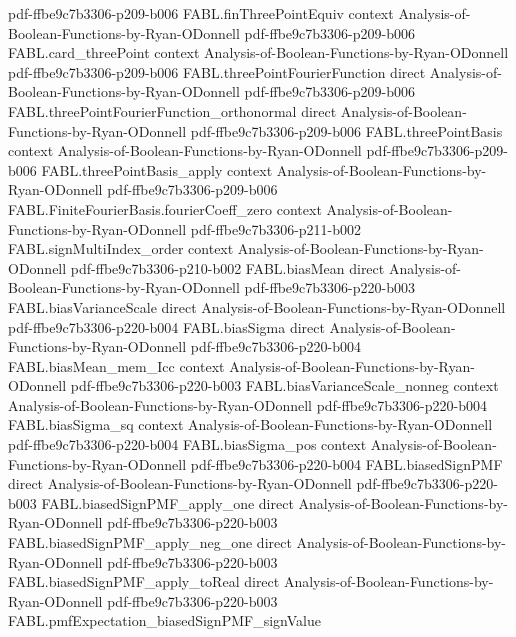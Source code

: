 \begin{theorem}
  {pdf-ffbe9c7b3306-p209-b006}
\proofstep
  {FABL.finThreePointEquiv}
  {context}
  {Analysis-of-Boolean-Functions-by-Ryan-ODonnell}
  {pdf-ffbe9c7b3306-p209-b006}
\proofstep
  {FABL.card_threePoint}
  {context}
  {Analysis-of-Boolean-Functions-by-Ryan-ODonnell}
  {pdf-ffbe9c7b3306-p209-b006}
\proofstep
  {FABL.threePointFourierFunction}
  {direct}
  {Analysis-of-Boolean-Functions-by-Ryan-ODonnell}
  {pdf-ffbe9c7b3306-p209-b006}
\proofstep
  {FABL.threePointFourierFunction_orthonormal}
  {direct}
  {Analysis-of-Boolean-Functions-by-Ryan-ODonnell}
  {pdf-ffbe9c7b3306-p209-b006}
\proofstep
  {FABL.threePointBasis}
  {context}
  {Analysis-of-Boolean-Functions-by-Ryan-ODonnell}
  {pdf-ffbe9c7b3306-p209-b006}
\proofstep
  {FABL.threePointBasis_apply}
  {context}
  {Analysis-of-Boolean-Functions-by-Ryan-ODonnell}
  {pdf-ffbe9c7b3306-p209-b006}
\proofstep
  {FABL.FiniteFourierBasis.fourierCoeff_zero}
  {context}
  {Analysis-of-Boolean-Functions-by-Ryan-ODonnell}
  {pdf-ffbe9c7b3306-p211-b002}
\proofstep
  {FABL.signMultiIndex_order}
  {context}
  {Analysis-of-Boolean-Functions-by-Ryan-ODonnell}
  {pdf-ffbe9c7b3306-p210-b002}
\proofstep
  {FABL.biasMean}
  {direct}
  {Analysis-of-Boolean-Functions-by-Ryan-ODonnell}
  {pdf-ffbe9c7b3306-p220-b003}
\proofstep
  {FABL.biasVarianceScale}
  {direct}
  {Analysis-of-Boolean-Functions-by-Ryan-ODonnell}
  {pdf-ffbe9c7b3306-p220-b004}
\proofstep
  {FABL.biasSigma}
  {direct}
  {Analysis-of-Boolean-Functions-by-Ryan-ODonnell}
  {pdf-ffbe9c7b3306-p220-b004}
\proofstep
  {FABL.biasMean_mem_Icc}
  {context}
  {Analysis-of-Boolean-Functions-by-Ryan-ODonnell}
  {pdf-ffbe9c7b3306-p220-b003}
\proofstep
  {FABL.biasVarianceScale_nonneg}
  {context}
  {Analysis-of-Boolean-Functions-by-Ryan-ODonnell}
  {pdf-ffbe9c7b3306-p220-b004}
\proofstep
  {FABL.biasSigma_sq}
  {context}
  {Analysis-of-Boolean-Functions-by-Ryan-ODonnell}
  {pdf-ffbe9c7b3306-p220-b004}
\proofstep
  {FABL.biasSigma_pos}
  {context}
  {Analysis-of-Boolean-Functions-by-Ryan-ODonnell}
  {pdf-ffbe9c7b3306-p220-b004}
\proofstep
  {FABL.biasedSignPMF}
  {direct}
  {Analysis-of-Boolean-Functions-by-Ryan-ODonnell}
  {pdf-ffbe9c7b3306-p220-b003}
\proofstep
  {FABL.biasedSignPMF_apply_one}
  {direct}
  {Analysis-of-Boolean-Functions-by-Ryan-ODonnell}
  {pdf-ffbe9c7b3306-p220-b003}
\proofstep
  {FABL.biasedSignPMF_apply_neg_one}
  {direct}
  {Analysis-of-Boolean-Functions-by-Ryan-ODonnell}
  {pdf-ffbe9c7b3306-p220-b003}
\proofstep
  {FABL.biasedSignPMF_apply_toReal}
  {direct}
  {Analysis-of-Boolean-Functions-by-Ryan-ODonnell}
  {pdf-ffbe9c7b3306-p220-b003}
\proofstep
  {FABL.pmfExpectation_biasedSignPMF_signValue}

\end{theorem}
